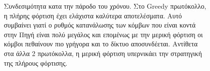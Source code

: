 \begin{figure}[H]
  \centering
  \caption{Συνδεσιμότητα κατα την πάροδο του χρόνου. Στο Greedy πρωτόκολλο, η πλήρης φόρτιση έχει ελάχιστα καλύτερα αποτελέσματα. Αυτό συμβαίνει γιατί ο ρυθμός
κατανάλωσης των κόμβων που είναι κοντά στην Πηγή είναι πολύ μεγάλος και επομένως με την μερική φόρτιση οι κόμβοι πεθαίνουν πιο γρήγορα και το δίκτυο αποσυνδέεται.
Αντίθετα στα άλλα 2 πρωτόκολλα, η μερική φόρτιση υπερνικάει την στρατηγική της πλήρους φόρτισης.}
  \label{fig:2exp_2_1}
\end{figure}


